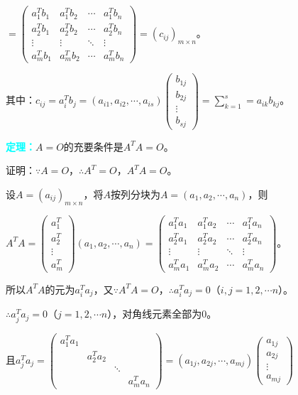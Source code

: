 \documentclass[UTF8, 12pt]{ctexart}
\begin{document}
$=\left(
\begin{array}{cccc}
a_1^Tb_1 & a_1^Tb_2 & \cdots & a_1^Tb_n \\
a_2^Tb_1 & a_2^Tb_2 & \cdots & a_2^Tb_n \\
\vdots & \vdots & \ddots & \vdots \\
a_{m}^Tb_1 & a_{m}^Tb_2 & \cdots & a_{m}^Tb_n
\end{array}
\right)=(c_{ij})_{m\times n}\text{。}$

其中：$c_{ij}=a_i^Tb_j=(a_{i1},a_{i2},\cdots,a_{is})\left(\begin{array}{c}
b_{1j} \\
b_{2j} \\
\vdots \\
b_{sj}
\end{array}\right)=\sum\limits_{k=1}^s=a_{ik}b_{kj}\text{。}$

\textcolor{aqua}{\textbf{定理：}}$A=O$的充要条件是$A^TA=O$。

证明：$\because A=O$，$\therefore A^T=O$，$A^TA=O$。

设$A=(a_{ij})_{m\times n}$，将$A$按列分块为$A=(a_1,a_2,\cdots,a_n)$，则 \medskip

$A^TA=\left(
\begin{array}{c}
a_1^T \\
a_2^T \\
\vdots \\
a_{m}^T
\end{array}
\right)(a_1,a_2,\cdots,a_n)=\left(
\begin{array}{cccc}
a_1^Ta_1 & a_1^Ta_2 & \cdots & a_1^Ta_n \\
a_2^Ta_1 & a_2^Ta_2 & \cdots & a_2^Ta_n \\
\vdots & \vdots & \ddots & \vdots \\
a_{m}^Ta_1 & a_{m}^Ta_2 & \cdots & a_{m}^Ta_n
\end{array}
\right)\text{。}$\medskip

所以$A^TA$的元为$a^T_ia_j$，又$\because A^TA=O$，$\therefore a^T_ia_j=0$（$i,j=1,2,\cdots n$）。

$\therefore a^T_ja_j=0$（$j=1,2,\cdots n$），对角线元素全部为0。\medskip

且$a^T_ja_j=\left(
\begin{array}{cccc}
a_1^Ta_1 & & & \\
& a_2^Ta_2 & & \\
& & \ddots & \\
& & & a_{m}^Ta_n
\end{array}
\right)=(a_{1j},a_{2j},\cdots,a_{mj})\left(\begin{array}{c}
a_{1j} \\
a_{2j} \\
\vdots \\
a_{mj}
\end{array}\right)$ \medskip
\end{document}
